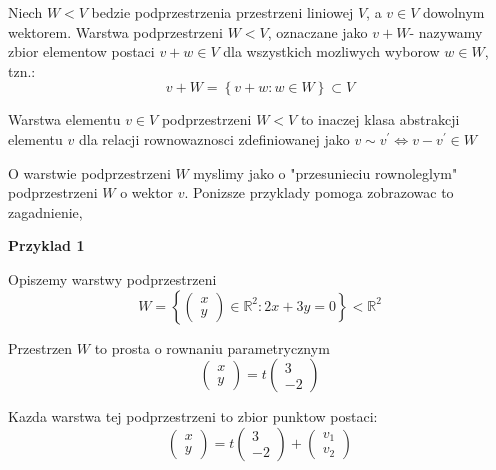 \documentclass{article}
\begin{document}
\begin{tcolorbox}[colback=white!90!red,colframe=black!35!red,title=Definicja 2.43 Warstwa podprzestrzeni]

Niech $W<V$ bedzie podprzestrzenia przestrzeni liniowej $V$, a $v \in V$ dowolnym wektorem. Warstwa podprzestrzeni $W<V$, oznaczane jako $v + W$- nazywamy zbior elementow postaci $v + w \in V$ dla wszystkich mozliwych wyborow $w \in W$, tzn.:
$$ v + W = \left\{ v + w: w \in W\right\} \subset V$$ 

Warstwa elementu $v \in V$ podprzestrzeni $W<V$ to inaczej klasa abstrakcji elementu $v$ dla relacji rownowaznosci zdefiniowanej jako $v \sim v^{'} \iff v - v^{'} \in W$

\end{tcolorbox}
\vspace{5mm}

O warstwie podprzestrzeni $W$ myslimy jako o "przesunieciu rownoleglym" podprzestrzeni $W$ o wektor $v$. Ponizsze przyklady pomoga zobrazowac to zagadnienie,

\textbf{Przyklad 1}

Opiszemy warstwy podprzestrzeni $$W = \left\{ \begin{pmatrix} x\\ y\end{pmatrix} \in \mathbb{R}^{2}: 2x + 3y = 0 \right\} <  \mathbb{R}^{2}$$

Przestrzen $W$ to prosta o rownaniu parametrycznym $$\begin{pmatrix} x\\y
\end{pmatrix} = t \begin{pmatrix} 3\\ -2
    
\end{pmatrix}$$

Kazda warstwa tej podprzestrzeni to zbior punktow postaci:
$$ \begin{pmatrix} x\\y
    
\end{pmatrix} = t \begin{pmatrix}
3\\-2
    
\end{pmatrix} +
\begin{pmatrix}
v_{1}\\v_{2}
    
\end{pmatrix}
$$
\end{document}
